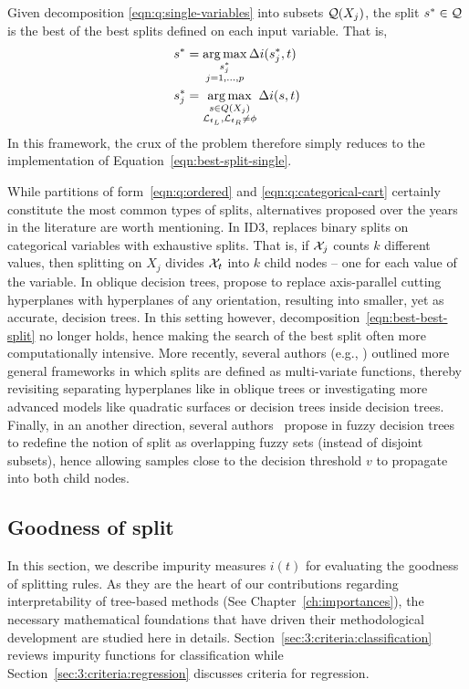Given decomposition \ref{eqn:q:single-variables} into subsets ${\cal Q}(X_j)$,
the split $s^* \in {\cal Q}$ is the best of the best splits defined on each input
variable. That is,
\begin{align}
s^* &= \operatorname*{arg\,max}_{\substack{s^*_j\\ j=1, \dots, p}} \Delta i(s^*_j, t) \label{eqn:best-best-split}\\
s^*_j &= \operatorname*{arg\,max}_{\substack{s \in Q(X_j)\\ {\cal L}_{t_L}, {\cal L}_{t_R} \neq \phi}} \Delta i(s, t) \label{eqn:best-split-single}
\end{align}
In this framework, the crux of the problem therefore
simply reduces to the implementation of Equation~\ref{eqn:best-split-single}.

While partitions of form~\ref{eqn:q:ordered} and \ref{eqn:q:categorical-cart}
certainly constitute the most common types of splits, alternatives proposed
over the years in the literature are worth mentioning. In ID3,
\citet{quinlan:1986} replaces binary splits on categorical variables with
exhaustive splits. That is, if ${\cal X}_j$ counts $k$ different values, then
splitting on $X_j$ divides ${\cal X}_t$ into $k$ child nodes -- one for each
value of the variable. In oblique decision trees, \citet{heath:1993} propose to
replace axis-parallel cutting hyperplanes with hyperplanes of any orientation,
resulting into smaller, yet as accurate, decision trees. In this setting
however, decomposition~\ref{eqn:best-best-split} no longer holds, hence making
the search of the best split often more computationally intensive. More
recently, several authors (e.g., \citep{gama:2004,criminisi:2013,botta:2013})
outlined more general frameworks in which splits are
defined as multi-variate functions, thereby revisiting separating hyperplanes
like in oblique trees or investigating more advanced models like quadratic
surfaces or decision trees inside decision trees. Finally, in an another
direction, several authors~\citep{adamo:1980,yuan:1995,olaru:2003} propose in fuzzy
decision trees to redefine the notion of split as overlapping fuzzy sets
(instead of disjoint subsets), hence allowing samples close to the decision
threshold $v$ to propagate into both child nodes.

\subsection{Goodness of split}
\label{sec:3:criteria}

In this section,  we describe impurity measures $i(t)$ for evaluating the
goodness of splitting rules. As they are the heart of our contributions
regarding interpretability of tree-based methods (See
Chapter~\ref{ch:importances}), the necessary mathematical foundations that have
driven their methodological development are studied here in details.
Section~\ref{sec:3:criteria:classification} reviews impurity functions for
classification while Section~\ref{sec:3:criteria:regression} discusses criteria
for regression.

